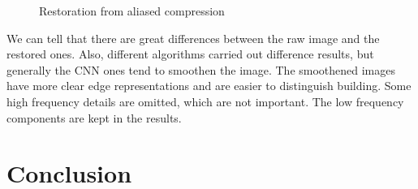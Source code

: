 \documentclass{article}
\begin{document}
\begin{figure}[H]
      \caption{Restoration from aliased compression}
  \end{figure}
  We can tell that there are great differences between the raw image and the restored ones.
  Also, different algorithms carried out difference results, but generally the CNN ones tend to smoothen the image.
  The smoothened images have more clear edge representations and are easier to distinguish building.
  Some high frequency details are omitted, which are not important. The low frequency components are kept in the results.
  
  \section{Conclusion}
  
%   
%   
  
\end{document}
